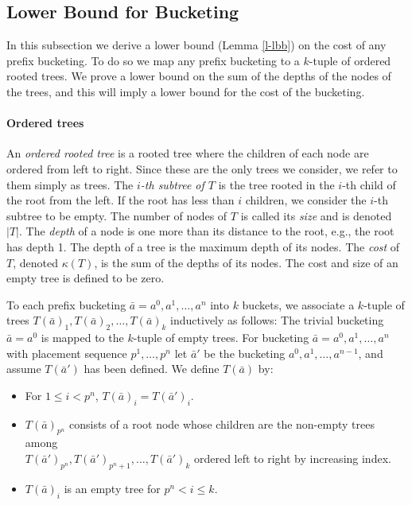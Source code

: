 \documentclass[11pt]{article}
\begin{document}
\subsection{Lower Bound for Bucketing}\label{s-lbb}

In this subsection we derive a lower bound (Lemma \ref{l-lbb}) on the cost of any prefix bucketing.
To do so we map any prefix bucketing to a $k$-tuple of ordered rooted trees.
We prove a lower bound on the sum of the depths of the nodes of the trees,
and this will imply a lower bound for the cost of the bucketing.

\paragraph{Ordered trees}
An {\em ordered rooted tree} is a rooted tree where the children of each node are ordered from left to right.
Since these are the only trees we consider, we refer to them simply as trees.
The \emph{$i$-th subtree of $T$} is the tree rooted in the $i$-th child of the root from the left.
If the root has less than $i$ children, we consider the $i$-th subtree to be empty.
The number of nodes of $T$ is called its {\em size} and is denoted $|T|$.
The {\em depth} of a node is  one more than its distance to the root, e.g., the root has depth 1.
The depth of a tree is the maximum depth of its nodes.
The \emph{cost} of $T$, denoted $\kappa(T)$, is the sum of the depths of its nodes.
The cost and size of an empty tree is defined to be zero.


To each prefix bucketing $\bar{a} = a^0,a^1,\dotsc,a^n$ into $k$ buckets, we associate
a $k$-tuple of trees $T(\bar{a})_1,T(\bar{a})_2,\dotsc,T(\bar{a})_k$ inductively 
as follows:
The trivial bucketing $\bar{a} = a^0$ is mapped to the $k$-tuple of empty trees.
For bucketing $\bar{a} = a^0,a^1,\dotsc,a^n$ with placement sequence $p^1,\ldots,p^n$
let $\bar{a}'$ be the bucketing $a^0,a^1,\dotsc,a^{n-1}$, and assume $T(\bar{a}')$ has been defined.
We define $T(\bar{a})$ by:
\begin{itemize}
\item For $1 \le i < p^n$,  $T(\bar{a})_i = T(\bar{a}')_i$.
\item $T(\bar{a})_{p^n}$ consists of
a root node whose children are the non-empty trees among \\
$T(\bar{a}')_{p^n},T(\bar{a}')_{p^n+1},\dotsc,T(\bar{a}')_k$ 
ordered left to right by  increasing index.
\item $T(\bar{a})_i$ is an empty tree for $p^n < i \le k$.
\end{itemize}
\end{document}
